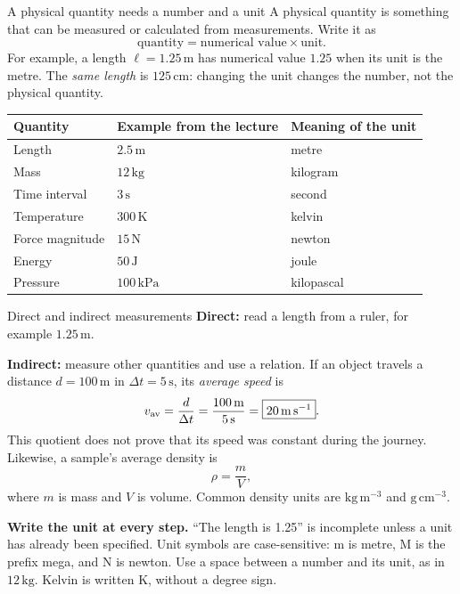 \documentclass[11pt,letterpaper]{article}
\newcommand{\unit}[1]{\,\mathrm{#1}}
\begin{document}
\begin{defbox}{A physical quantity needs a number and a unit}
A physical quantity is something that can be measured or calculated from measurements. Write it as
\[
 \boxed{\text{quantity}=\text{numerical value}\times\text{unit}.}
\]
For example, a length $\ell=1.25\unit{m}$ has numerical value $1.25$ when its unit is the metre. The \emph{same length} is $125\unit{cm}$: changing the unit changes the number, not the physical quantity.
\begin{center}
\begin{tabular}{lll}
\toprule
Quantity & Example from the lecture & Meaning of the unit\\
\midrule
Length & $2.5\unit{m}$ & metre\\
Mass & $12\unit{kg}$ & kilogram\\
Time interval & $3\unit{s}$ & second\\
Temperature & $300\unit{K}$ & kelvin\\
Force magnitude & $15\unit{N}$ & newton\\
Energy & $50\unit{J}$ & joule\\
Pressure & $100\unit{kPa}$ & kilopascal\\
\bottomrule
\end{tabular}
\end{center}
\end{defbox}

\begin{examplebox}{Direct and indirect measurements}
\textbf{Direct:} read a length from a ruler, for example $1.25\unit{m}$.

\textbf{Indirect:} measure other quantities and use a relation. If an object travels a distance $d=100\unit{m}$ in $\Delta t=5\unit{s}$, its \emph{average speed} is
\[
 v_{\rm av}=\frac{d}{\Delta t}=\frac{100\unit{m}}{5\unit{s}}
 =\boxed{20\unit{m\,s^{-1}}}.
\]
This quotient does not prove that its speed was constant during the journey. Likewise, a sample's average density is
\[
 \boxed{\rho=\frac{m}{V}},
\]
where $m$ is mass and $V$ is volume. Common density units are $\mathrm{kg\,m^{-3}}$ and $\mathrm{g\,cm^{-3}}$.
\end{examplebox}

\begin{watchbox}
\textbf{Write the unit at every step.} ``The length is 1.25'' is incomplete unless a unit has already been specified. Unit symbols are case-sensitive: $\mathrm{m}$ is metre, $\mathrm{M}$ is the prefix mega, and $\mathrm{N}$ is newton. Use a space between a number and its unit, as in $12\unit{kg}$. Kelvin is written $\mathrm{K}$, without a degree sign.
\end{watchbox}
\end{document}

